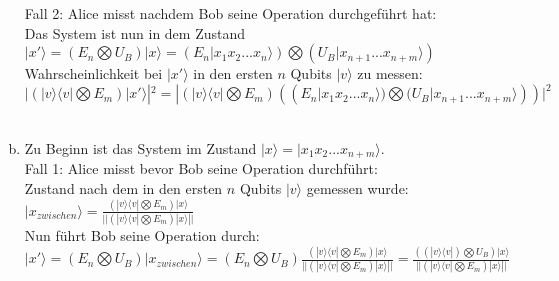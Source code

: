 \documentclass[a4paper]{scrartcl}
\begin{document}
\begin{enumerate}[a)]
\noindent Fall 2: Alice misst nachdem Bob seine Operation durchgeführt hat:\\
Das System ist nun in dem Zustand $|x'\rangle = (E_n\bigotimes U_B)|x\rangle = (E_n|x_1x_2...x_n\rangle)\bigotimes(U_B|x_{n+1}...x_{n+m}\rangle)$\\
Wahrscheinlichkeit bei $|x'\rangle$ in den ersten $n$ Qubits $|v\rangle$ zu messen:\\
$|(|v\rangle \langle v|\bigotimes E_m)|x'\rangle|^2= |(|v\rangle \langle v|\bigotimes E_m)((E_n|x_1x_2...x_n\rangle)\bigotimes(U_B|x_{n+1}...x_{n+m}\rangle))|^2$\\\\

\item Zu Beginn ist das System im Zustand $|x\rangle =|x_1x_2...x_{n+m}\rangle$. \\
Fall 1: Alice misst bevor Bob seine Operation durchführt:\\
Zustand nach dem in den ersten $n$ Qubits $|v\rangle$ gemessen wurde: $|x_{zwischen}\rangle= \frac{(|v\rangle\langle v|\bigotimes E_m)|x\rangle}{||(|v\rangle\langle v|\bigotimes E_m)|x\rangle||}$\\
Nun führt Bob seine Operation durch:\\
$|x'\rangle = (E_n\bigotimes U_B)|x_{zwischen}\rangle= (E_n\bigotimes U_B)\frac{(|v\rangle\langle v|\bigotimes E_m)|x\rangle}{||(|v\rangle\langle v|\bigotimes E_m)|x\rangle||}= \frac{((|v\rangle\langle v|)\bigotimes U_B)|x\rangle}{||(|v\rangle\langle v|\bigotimes E_m)|x\rangle||}$\\\\


\end{enumerate}
\end{document}
